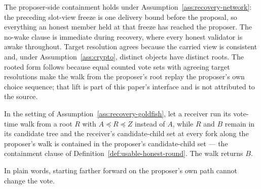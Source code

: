 \begin{remark}
\label{rem:view-merge-discharge}
The proposer-side containment holds under
Assumption~\ref{ass:recovery-network}: the preceding slot-view freeze is
one delivery bound before the proposal, so everything an honest member
held at that freeze has reached the proposer.  The no-wake clause is
immediate during recovery, where every honest validator is awake
throughout.  Target resolution agrees because the carried view is
consistent and, under Assumption~\ref{ass:crypto}, distinct objects
have distinct roots.  The rooted form follows because equal counted
vote sets with agreeing target resolutions make the walk from the
proposer's root replay the proposer's own choice sequence; that lift is
part of this paper's interface and is not attributed to the source.
\end{remark}

\begin{lemma}
\label{lem:forward-root}
In the setting of Assumption~\ref{ass:recovery-goldfish}, let a receiver
run its vote-time walk from a root \(R\) with \(A\preceq R\preceq Z\)
instead of \(A\), while \(R\) and \(B\) remain in its candidate tree and
the receiver's candidate-child set at every fork along the proposer's
walk is contained in the proposer's candidate-child set --- the
containment clause of Definition~\ref{def:usable-honest-round}.  The
walk returns \(B\).

In plain words, starting farther forward on the proposer's own path cannot
change the vote.
\end{lemma}

